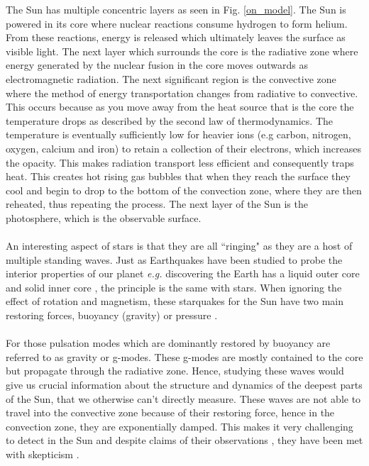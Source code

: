 \documentclass[12pt]{ociamthesis}
\newcommand{\np}{\\ \\}
\begin{document}
The Sun has multiple concentric layers as seen in Fig. \ref{on_model}. The Sun is powered in its core where nuclear reactions consume hydrogen to form helium. From these reactions, energy is released which ultimately leaves the surface as visible light. The next layer which surrounds the core is the radiative zone where energy generated by the nuclear fusion in the core moves outwards as electromagnetic radiation. The next significant region is the convective zone where the method of energy transportation changes from radiative to convective. This occurs because as you move away from the heat source that is the core the temperature drops as described by the second law of thermodynamics. The temperature is eventually sufficiently low for heavier ions (e.g carbon, nitrogen, oxygen, calcium and iron) to retain a collection of their electrons, which increases the opacity. This makes radiation transport less efficient and consequently traps heat. This creates hot rising gas bubbles that when they reach the surface they cool and begin to drop to the bottom of the convection zone, where they are then reheated, thus repeating the process. The next layer of the Sun is the photosphere, which is the observable surface. \np
%
An interesting aspect of stars is that they are all ``ringing" as they are a host of multiple standing waves. Just as Earthquakes have been studied to probe the interior properties of our planet \textit{e.g.} discovering the Earth has a liquid outer core and solid inner core \citep{Lehmann1936}, the principle is the same with stars. When ignoring the effect of rotation and magnetism, these starquakes for the Sun have two main restoring forces, buoyancy (gravity) or pressure \citep{Appourchaux2010AARv18197A}. \np
%
For those pulsation modes which are dominantly restored by buoyancy are referred to as gravity or g-modes. These g-modes are mostly contained to the core but propagate through the radiative zone. Hence, studying these waves would give us crucial information about the structure and dynamics of the deepest parts of the Sun, that we otherwise can't directly measure. These waves are not able to travel into the convective zone because of their restoring force, hence in the convection zone, they are exponentially damped. This makes it very challenging to detect in the Sun and despite claims of their observations \citep{ Garc2007Sci3161591G, Fossat2017AA604A40F, Fossat2018AA612L1F}, they have been met with skepticism \citep{Appourchaux2010AARv18197A, Schunker2018SoPh29395S,Appourchaux2019AA624A106A, Scherrer2019ApJ87742S}. \np
%
\end{document}
